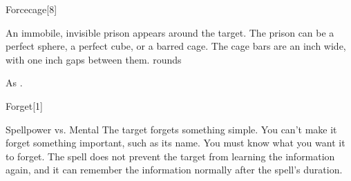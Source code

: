 \begin{spellsection}{Forcecage}[8]
    \begin{spellheader}
    \end{spellheader}
    \begin{spellcontent}
        \begin{spelltargetinginfo}
        \end{spelltargetinginfo}
        \begin{spelleffects}
            \spelleffect An immobile, invisible prison appears around the target. The prison can be a perfect sphere, a perfect cube, or a barred cage. The cage bars are an inch wide, with one inch gaps between them.
             rounds
        \end{spelleffects}
    \end{spellcontent}
    \begin{spellfooter}
        \spellnotes As .
        \miscastrandom
    \end{spellfooter}
\end{spellsection}

\begin{spellsection}{Forget}[1]
    \begin{spellheader}
    \end{spellheader}
    \begin{spellcontent}
        \begin{spelltargetinginfo}
        \end{spelltargetinginfo}
        \begin{spelleffects}
            \begin{spellattack}{Spellpower vs. Mental}
                \spelleffect The target forgets something simple. You can't make it forget something important, such as its name. You must know what you want it to forget. The spell does not prevent the target from learning the information again, and it can remember the information normally after the spell's duration.
            \end{spellattack}
            \spelldur \durlong
        \end{spelleffects}
    \end{spellcontent}
    \begin{spellfooter}
        \miscastrandom
    \end{spellfooter}
\end{spellsection}

